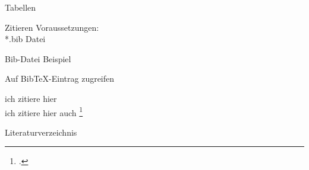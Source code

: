 \begin{frame}{Tabellen}
\begin{Code}
\centering

\end{Code}
\end{frame}

\begin{frame}{Zitieren}
Voraussetzungen:\\
\pause
*.bib Datei\\
\pause
{}
\begin{Code}
\centering

\end{Code}

\end{frame}
\begin{frame}{Bib-Datei Beispiel}
\begin{Code}
\centering

\end{Code}
\end{frame}
\begin{frame}{Auf BibTeX-Eintrag zugreifen}
\begin{Code}
\centering

\end{Code}

ich zitiere hier \cite{braun:scala}\\
ich zitiere hier auch \footcite{braun:scala}
\end{frame}
\begin{frame}{Literaturverzeichnis}
\begin{Code}
\centering

\end{Code}
\printbibliography
\end{frame}